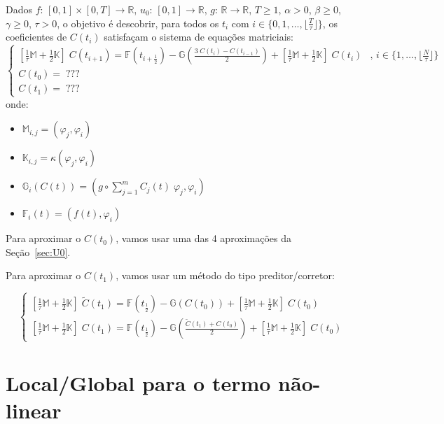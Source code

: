 \documentclass[a4paper]{article}
\newcommand{\typ}{:\,}
\newcommand{\vphi}{\varphi}
\begin{document}
Dados
\(f \typ [0, 1] \times [0, T] \to \mathbb{R}\),
\(u_0 \typ [0, 1] \to \mathbb{R}\),
\(g \typ \mathbb{R} \to \mathbb{R}\),
\(T \ge 1\),
\(\alpha > 0\),
\(\beta \ge 0\),
\(\gamma \ge 0\),
\(\tau > 0\),
o objetivo é descobrir,
para todos os \(t_i\)
com \(i \in \{ 0, 1, \dots, \lfloor \frac{T}{\tau} \rfloor \}\),
os coeficientes de \(C(t_i)\)
satisfaçam o sistema de equações matriciais:
\[ \begin{cases}
    \left[ \frac1\tau \mathbb{M} + \frac12 \mathbb{K} \right] \; C(t_{i+1})
    = \mathbb{F}\left( t_{i+\frac12} \right)
    - \mathbb{G}\left( \frac{3 \; C(t_i) - C(t_{i-1})}{2} \right)
    + \left[ \frac1\tau \mathbb{M} + \frac12 \mathbb{K} \right] \; C(t_i)
        &\text{, } i \in \{ 1, \dots, \lfloor \frac{N}{\tau} \rfloor \}
    \\
    C(t_0) = \; ???
    \\
    C(t_1) = \; ???
\end{cases} \]
onde:
\begin{itemize}
\item \(
    \mathbb{M}_{i, j} = (\vphi_j, \vphi_i)
\)
\item \(
    \mathbb{K}_{i, j} = \kappa(\vphi_j, \vphi_i)
\)
\item \(
    \mathbb{G}_{i}(C(t)) = (g \circ \sum_{j=1}^m{ C_j(t) \; \vphi_j }, \vphi_i)
\)
\item \(
    \mathbb{F}_i(t) = (f(t), \vphi_i)
\)
\end{itemize}

Para aproximar o \(C(t_0)\),
vamos usar uma das 4 aproximações da Seção~\ref{sec:U0}.

Para aproximar o \(C(t_1)\),
vamos usar um método do tipo preditor/corretor:

\[ \begin{cases}
    \left[ \frac1\tau \mathbb{M} + \frac12 \mathbb{K} \right] \; \tilde{C}(t_1)
    = \mathbb{F}\left( t_{\frac12} \right)
    - \mathbb{G}\left( C(t_0) \right)
    + \left[ \frac1\tau \mathbb{M} + \frac12 \mathbb{K} \right] \; C(t_0)
    \\
    \left[ \frac1\tau \mathbb{M} + \frac12 \mathbb{K} \right] \; C(t_1)
    = \mathbb{F}\left( t_{\frac12} \right)
    - \mathbb{G}\left( \frac{\tilde{C}(t_1) + C(t_0)}{2} \right)
    + \left[ \frac1\tau \mathbb{M} + \frac12 \mathbb{K} \right] \; C(t_0)
\end{cases} \]

\section{Local/Global para o termo não-linear}
\end{document}
